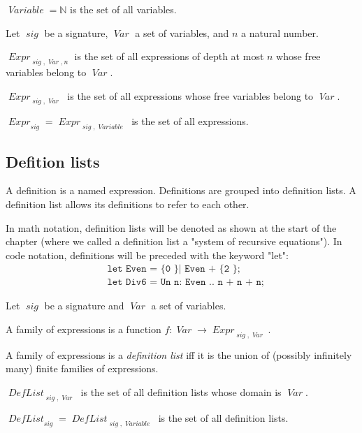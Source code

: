 \documentclass[oneside,12pt]{book}
\theoremstyle{definition}
\theoremstyle{remark}
\newcommand\var[1]{\mathop{\mathit{#1}}\nolimits}
\newcommand{\sig}{\var{sig}}
\newcommand{\Var}{\var{Var}}
\newcommand{\Variable}{\var{Variable}}
\newcommand{\Expr}{\var{Expr}}
\newcommand{\DefList}{\var{DefList}}
\begin{document}
\begin{defBox}
  $\Variable = \mathbb{N}$ is the set of all variables.

  \medskip \noindent
  Let $\sig$ be a signature, $\Var$ a set of variables, and $n$ a natural number.
  
  \medskip \noindent
  $\Expr_{\sig,\Var,n}$ is the set of all expressions of depth at most $n$ whose
  free variables belong to $\Var$.

  \medskip \noindent $\Expr_{\sig,\Var}$ is the set of all expressions whose
  free variables belong to $\Var$.
  
  \medskip \noindent $\Expr_{\sig} = \Expr_{\sig,\Variable}$ is the set of all
  expressions.
\end{defBox}

\subsection{Defition lists}

A definition is a named expression. Definitions are grouped into definition
lists. A definition list allows its definitions to refer to each other.

In math notation, definition lists will be denoted as shown at the start of the
chapter (where we called a definition list a "system of recursive equations").
In code notation, definitions will be preceded with the keyword "let":
\begin{align*}
  &\texttt{let Even = \{ 0 \} | Even + \{ 2 \};} \\
  &\texttt{let Div6 = Un n: Even .. n + n + n;}
\end{align*}

\begin{defBox}
  Let $\sig$ be a signature and $\Var$ a set of variables.
  
  \medskip \noindent
  A family of expressions is a function $f\colon \Var \to \Expr_{\sig,\Var}$.
  
  \medskip \noindent A family of expressions is a \textit{definition list} iff it is
  the union of (possibly infinitely many) finite families of expressions.

  \medskip \noindent $\DefList_{\sig,\Var}$ is the set of all definition lists
  whose domain is $\Var$.
  
  \nopagebreak \medskip \noindent $\DefList_{\sig} = \DefList_{\sig,\Variable}$
  is the set of all definition lists.
\end{defBox}
\end{document}

